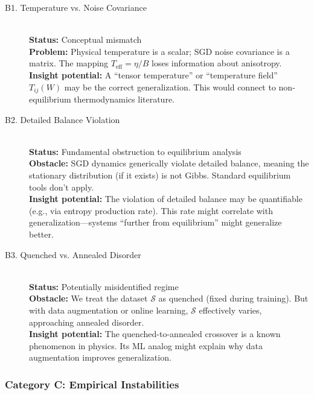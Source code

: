 \documentclass[
  journal=largetwo,
  year=2025,
  volume=37,
]{cup-journal}
\begin{document}
\begin{description}
    \item[B1. Temperature vs. Noise Covariance] \hfill \\
    \textbf{Status:} Conceptual mismatch \\
    \textbf{Problem:} Physical temperature is a scalar; SGD noise covariance is a matrix. The mapping $T_{\text{eff}} = \eta/B$ loses information about anisotropy. \\
    \textbf{Insight potential:} A ``tensor temperature'' or ``temperature field'' $T_{ij}(W)$ may be the correct generalization. This would connect to non-equilibrium thermodynamics literature.
    
    \item[B2. Detailed Balance Violation] \hfill \\
    \textbf{Status:} Fundamental obstruction to equilibrium analysis \\
    \textbf{Obstacle:} SGD dynamics generically violate detailed balance, meaning the stationary distribution (if it exists) is not Gibbs. Standard equilibrium tools don't apply. \\
    \textbf{Insight potential:} The violation of detailed balance may be quantifiable (e.g., via entropy production rate). This rate might correlate with generalization---systems ``further from equilibrium'' might generalize better.
    
    \item[B3. Quenched vs. Annealed Disorder] \hfill \\
    \textbf{Status:} Potentially misidentified regime \\
    \textbf{Obstacle:} We treat the dataset $\mathcal{S}$ as quenched (fixed during training). But with data augmentation or online learning, $\mathcal{S}$ effectively varies, approaching annealed disorder. \\
    \textbf{Insight potential:} The quenched-to-annealed crossover is a known phenomenon in physics. Its ML analog might explain why data augmentation improves generalization.
\end{description}

\subsubsection{Category C: Empirical Instabilities}
\end{document}
